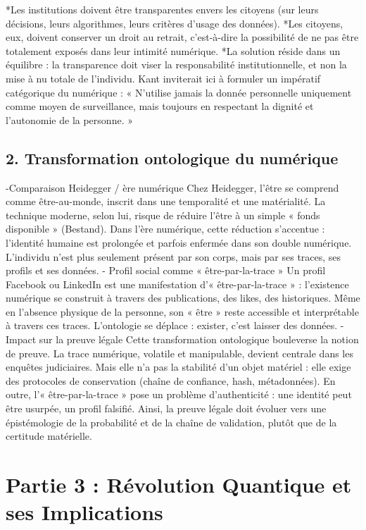 \documentclass[]{article}
\begin{document}
*Les institutions doivent être transparentes envers les citoyens (sur leurs décisions, leurs algorithmes, leurs critères d’usage des données).
*Les citoyens, eux, doivent conserver un droit au retrait, c’est-à-dire la possibilité de ne pas être totalement exposés dans leur intimité numérique.
*La solution réside dans un équilibre : la transparence doit viser la responsabilité institutionnelle, et non la mise à nu totale de l’individu. Kant inviterait ici à formuler un impératif catégorique du numérique : « N’utilise jamais la donnée personnelle uniquement comme moyen de surveillance, mais toujours en respectant la dignité et l’autonomie de la personne. »
\subsection*{2. Transformation ontologique du numérique}
-Comparaison Heidegger / ère numérique
Chez Heidegger, l’être se comprend comme être-au-monde, inscrit dans une temporalité et une matérialité. La technique moderne, selon lui, risque de réduire l’être à un simple « fonds disponible » (Bestand). Dans l’ère numérique, cette réduction s’accentue : l’identité humaine est prolongée et parfois enfermée dans son double numérique. L’individu n’est plus seulement présent par son corps, mais par ses traces, ses profils et ses données.
- Profil social comme « être-par-la-trace »
Un profil Facebook ou LinkedIn est une manifestation d’« être-par-la-trace » : l’existence numérique se construit à travers des publications, des likes, des historiques. Même en l’absence physique de la personne, son « être » reste accessible et interprétable à travers ces traces. L’ontologie se déplace : exister, c’est laisser des données.
-Impact sur la preuve légale
Cette transformation ontologique bouleverse la notion de preuve. La trace numérique, volatile et manipulable, devient centrale dans les enquêtes judiciaires. Mais elle n’a pas la stabilité d’un objet matériel : elle exige des protocoles de conservation (chaîne de confiance, hash, métadonnées). En outre, l’« être-par-la-trace » pose un problème d’authenticité : une identité peut être usurpée, un profil falsifié. Ainsi, la preuve légale doit évoluer vers une épistémologie de la probabilité et de la chaîne de validation, plutôt que de la certitude matérielle.
\section*{Partie 3 : Révolution Quantique et ses Implications}
\end{document}
